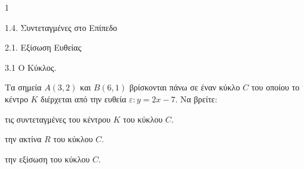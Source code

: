 \begin{ylh}{1}
    \item 1.4. Συντεταγμένες στο Επίπεδο
    \item 2.1. Εξίσωση Ευθείας
    \item 3.1 Ο Κύκλος.
\end{ylh}
\begin{figure} %
    \centering
\end{figure}

Τα σημεία $A(3, 2)$ και $B(6, 1)$ βρίσκονται πάνω σε έναν κύκλο $C$ του οποίου το κέντρο $K$ διέρχεται από την ευθεία $\varepsilon: y = 2x - 7$. Να βρείτε:
\begin{alist}
\item τις συντεταγμένες του κέντρου $K$ του κύκλου $C$. 
\item την ακτίνα $R$ του κύκλου $C$. 
\item την εξίσωση του κύκλου $C$. 
\end{alist}